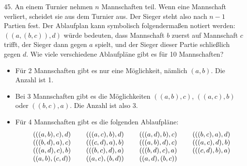 \begin{problem}{45.}
	An einem Turnier nehmen $n$ Mannschaften teil. Wenn eine Mannschaft verliert, scheidet sie aus dem Turnier aus. Der Sieger steht also nach $n-1$ Partien fest. 
	Der Ablaufplan kann symbolisch folgendermaßen notiert werden: $((a,(b,c)),d)$ würde bedeuten, dass Mannschaft $b$ zuerst  auf Mannschaft $c$ trifft, der Sieger dann gegen $a$ spielt, und der Sieger dieser Partie schließlich gegen $d$. 
	Wie viele verschiedene Ablaufpläne gibt es für 10 Mannschaften?
	\begin{itemize}
		\item Für 2 Mannschaften gibt es nur eine Möglichkeit, nämlich $(a,b)$. Die Anzahl ist 1.
		\item Bei 3 Mannschaften gibt es die Möglichkeiten $((a,b),c)$, $((a,c),b)$ oder $((b,c),a)$. Die Anzahl ist also 3.
		\item Für 4 Mannschaften gibt es die folgenden Ablaufpläne:
			\begin{equation*}
				\begin{array}{@{}cccc@{}}
					(((a,b),c),d) & \quad\;(((a,c),b),d) & \quad\;(((a,d),b),c) & \quad\;(((b,c),a),d) \\
					(((b,d),a),c) & \quad\;(((c,d),a),b) & \quad\;(((a,b),d),c) & \quad\;(((a,c),d),b) \\ 
					(((a,d),c),b) & \quad\;(((b,c),d),a) & \quad\;(((b,d),c),a) & \quad\;(((c,d),b),a) \\
					((a,b),(c,d)) & \quad\;((a,c),(b,d)) & \quad\;((a,d),(b,c))
				\end{array}
			\end{equation*}
	\end{itemize}
\end{problem}

